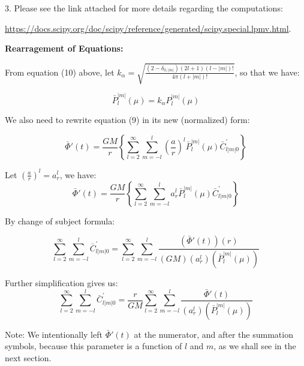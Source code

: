 \documentclass{article}
\begin{document}
3. Please see the link attached for more details regarding the computations: 

\href{https://docs.scipy.org/doc/scipy/reference/generated/scipy.special.lpmv.html}{https://docs.scipy.org/doc/scipy/reference/generated/scipy.special.lpmv.html}.

\vspace{3}

\textbf{Rearragement of Equations:}

\vspace{3}

From equation (10) above, let $k_{\alpha} = \sqrt{\frac{{(2-\delta_{0,|m|})(2l+1)(l-|m|)!}}{{4\pi (l+|m|)!}}}$, so that we have: 

\begin{equation}
    \bar{P}_{l}^{|m|} (\mu) = k_{\alpha} P^{|m|}_{l} (\mu)
\end{equation}

We also need to rewrite equation (9) in its new (normalized) form: 

\begin{equation}
\bar{\Phi}{'}(t) = \frac{GM}{r}\left\{\sum_{l=2}^{\infty}\sum_{m=-l}^{l}\left(\frac{a}{r}\right)^{l}\bar{P}_{l}^{|m|}(\mu)\bar{C}_{l|m|0}^{'}\right\}
\end{equation}

Let $(\frac{a}{r})^{l} = a_{r}^{l}$, we have: 
\begin{equation}
\bar{\Phi}{'}(t) = \frac{GM}{r}\left\{\sum_{l=2}^{\infty}\sum_{m=-l}^{l}a_{r}^{l}\bar{P}_{l}^{|m|}(\mu)\bar{C}_{l|m|0}^{'}\right\}
\end{equation}

By change of subject formula:

\begin{equation}
\sum_{l=2}^{\infty}\sum_{m=-l}^{l}\bar{C}_{l|m|0}^{'} = \sum_{l=2}^{\infty}\sum_{m=-l}^{l}\frac{(\bar{\Phi}{'}(t))(r)}{(GM)(a_{r}^{l})(\bar{P}_{l}^{|m|}(\mu))}
\end{equation}

Further simplification gives us: 
\begin{equation}
\sum_{l=2}^{\infty}\sum_{m=-l}^{l}\bar{C}_{l|m|0}^{'} =\frac{r}{GM} \sum_{l=2}^{\infty}\sum_{m=-l}^{l}\frac{\bar{\Phi}{'}(t)}{(a_{r}^{l})(\bar{P}_{l}^{|m|}(\mu))}
\end{equation}

Note: 
We intentionally left $\bar{\Phi}{'}(t)$ at the numerator, and after the summation symbols, because this parameter is a function of $l$ and $m$, as we shall see in the next section. 
\end{document}
